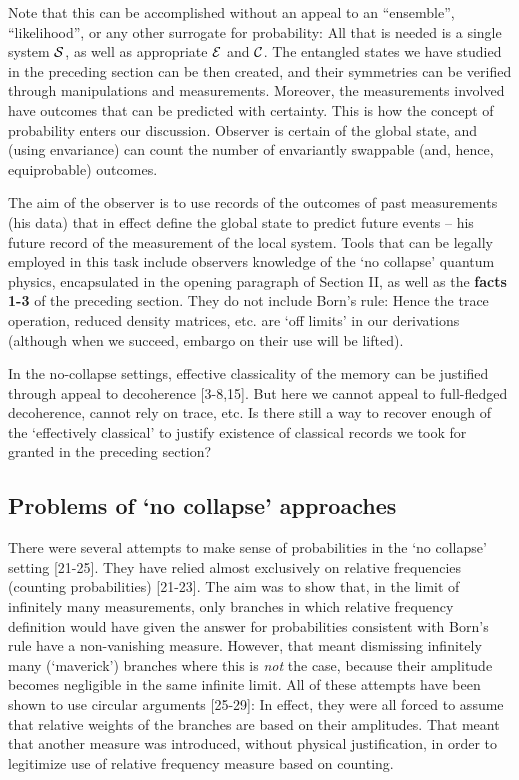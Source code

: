 \documentclass[aps,pra,epsfig,11pt,floatfix]{revtex4}
\begin{document}
Note that this can be accomplished without an appeal to an ``ensemble'',
``likelihood'',  or any other surrogate for probability: All that is needed is a
single system $\cal S$, as well as appropriate ${\cal E}$ and ${\cal C}$.
The entangled states we have studied in the preceding section can be then 
created, and their symmetries can be verified through manipulations and 
measurements. Moreover, the measurements involved have outcomes that 
can be predicted with certainty. This is how the concept of probability enters 
our discussion. Observer is certain of the global state, and (using envariance)
can count the number of envariantly swappable (and, hence, equiprobable)
outcomes.
 
The aim of the observer is to use records of the outcomes of past measurements
(his data) that in effect define the global state to predict future events -- his future 
record of the measurement of the local system. Tools that can be
legally employed in this task include observers knowledge of the `no collapse'
quantum physics, encapsulated in the opening paragraph of Section II, as well as
the {\bf facts 1-3} of the preceding section. They do not include Born's rule:
Hence the trace operation, reduced density matrices, etc. are `off limits' in our
derivations (although when we succeed, embargo on their use will be lifted).

In the no-collapse settings, effective classicality of the memory can be
justified through appeal to decoherence [3-8,15]. But here we cannot appeal to
full-fledged decoherence, cannot rely on trace, etc. Is there still a way to
recover enough of the `effectively classical' to justify existence of
classical records we took for granted in the preceding section?


\subsection{Problems of `no collapse' approaches}

There were several attempts to make sense of probabilities in the `no collapse'
setting [21-25]. They have relied almost exclusively on relative frequencies
(counting probabilities) [21-23]. The aim was to show that, in the limit of
infinitely many measurements, only branches in which relative frequency 
definition would have given the answer for probabilities consistent with Born's rule 
have a non-vanishing measure. However, that meant dismissing infinitely many 
(`maverick') branches where this is {\it not} the case, because their amplitude
becomes negligible in the same infinite limit. All of these attempts have been
shown to use circular arguments [25-29]: In effect, they were all forced to
assume that relative weights of the branches are based on their amplitudes.
That meant that another measure was introduced, without physical justification,
in order to legitimize use of relative frequency measure based on counting.
\end{document}
